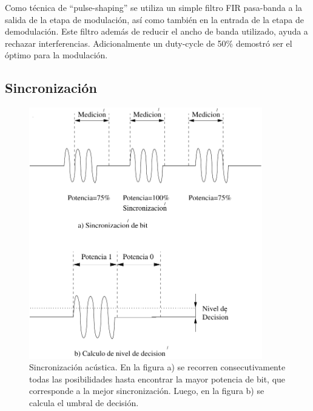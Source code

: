 Como técnica de ``pulse-shaping'' se utiliza un simple filtro FIR pasa-banda a la salida de la etapa de modulación, así como también en la entrada de la etapa de demodulación. Este filtro además de reducir el ancho de banda utilizado, ayuda a rechazar interferencias.
Adicionalmente un duty-cycle de 50\% demostró ser el óptimo para la modulación.

\subsection{Sincronización}

\begin{figure}[t]
  \centering
    \includegraphics[width=4in]{graphs/acusync.pdf}
\caption {Sincronización acústica. En la figura a) se recorren consecutivamente todas las posibilidades hasta encontrar la mayor potencia de bit, que corresponde a la mejor sincronización. Luego, en la figura b) se calcula el umbral de decisión.}
\label{fig:acusync}
\end{figure}

